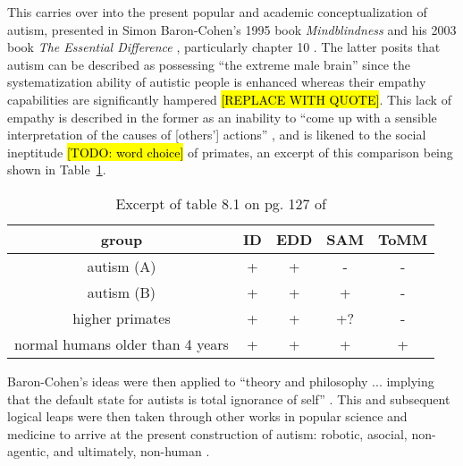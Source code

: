\documentclass[letterpaper]{article}
\begin{document}

This carries over into the present popular and academic conceptualization of autism, presented in Simon Baron-Cohen's 1995 book \textit{Mindblindness} \cite{mb} and his 2003 book \textit{The Essential Difference} \cite{diff}, particularly chapter 10 \cite[p.~12]{auto}. The latter posits that autism can be described as possessing “the extreme male brain” since the systematization ability of autistic people is enhanced whereas their empathy capabilities are significantly hampered \hl{[REPLACE WITH QUOTE]}. This lack of empathy is described in the former as an inability to “come up with a sensible interpretation of the causes of [others'] actions” \cite[p.~4]{mb}, and is likened to the social ineptitude \hl{[TODO: word choice]} of primates, an excerpt of this comparison being shown in Table~\ref{tab:mb}.

\begin{table}[h]
    \centering
    \begin{tabular}{c|cccc}
        group & ID & EDD & SAM & ToMM\\
        \hline
        autism (A) & + & + & - & -\\
        autism (B) & + & + & + & -\\
        higher primates & + & + & +? & -\\
        normal humans older than 4 years & + & + & + & +\\
    \end{tabular}
    \caption{Excerpt of table 8.1 on pg. 127 of \cite{mb}}\label{tab:mb}
\end{table}

Baron-Cohen's ideas were then applied to “theory and philosophy ... implying that the default state for autists is total ignorance of self” \cite[p.~13]{auto}. This and subsequent logical leaps were then taken through other works in popular science and medicine to arrive at the present construction of autism: robotic, asocial, non-agentic, and ultimately, non-human \cite[pp.~14-5]{auto}.
\end{document}

